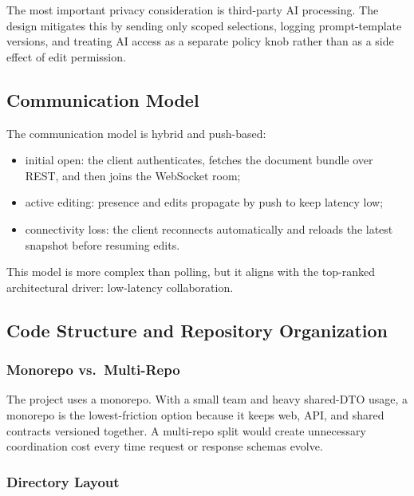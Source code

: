 The most important privacy consideration is third-party AI processing. The design mitigates this by sending only scoped selections, logging prompt-template versions, and treating AI access as a separate policy knob rather than as a side effect of edit permission.

\subsection{Communication Model}

The communication model is hybrid and push-based:

\begin{itemize}[leftmargin=1.3em]
    \item initial open: the client authenticates, fetches the document bundle over REST, and then joins the WebSocket room;
    \item active editing: presence and edits propagate by push to keep latency low;
    \item connectivity loss: the client reconnects automatically and reloads the latest snapshot before resuming edits.
\end{itemize}

This model is more complex than polling, but it aligns with the top-ranked architectural driver: low-latency collaboration.

\subsection{Code Structure and Repository Organization}

\subsubsection{Monorepo vs.\ Multi-Repo}

The project uses a monorepo. With a small team and heavy shared-DTO usage, a monorepo is the lowest-friction option because it keeps web, API, and shared contracts versioned together. A multi-repo split would create unnecessary coordination cost every time request or response schemas evolve.

\subsubsection{Directory Layout}

